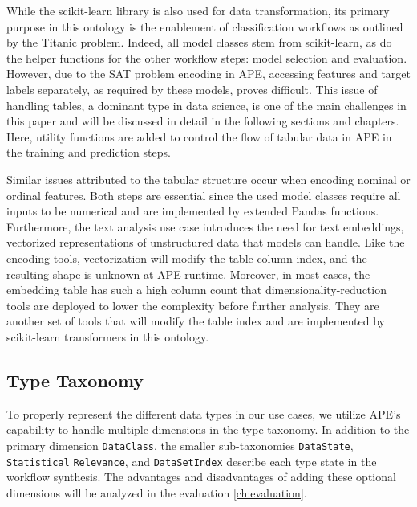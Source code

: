 While the scikit-learn library is also used for data transformation, its primary purpose in this ontology is the enablement of classification workflows as outlined by the Titanic problem. Indeed, all model classes stem from scikit-learn, as do the helper functions for the other workflow steps: model selection and evaluation. However, due to the SAT problem encoding in APE, accessing features and target labels separately, as required by these models, proves difficult. This issue of handling tables, a dominant type in data science, is one of the main challenges in this paper and will be discussed in detail in the following sections and chapters. Here, utility functions are added to control the flow of tabular data in APE in the training and prediction steps.

Similar issues attributed to the tabular structure occur when encoding nominal or ordinal features. Both steps are essential since the used model classes require all inputs to be numerical and are implemented by extended Pandas functions. Furthermore, the text analysis use case introduces the need for text embeddings, vectorized representations of unstructured data that models can handle. Like the encoding tools, vectorization will modify the table column index, and the resulting shape is unknown at APE runtime. Moreover, in most cases, the embedding table has such a high column count that dimensionality-reduction tools are deployed to lower the complexity before further analysis. They are another set of tools that will modify the table index and are implemented by scikit-learn transformers in this ontology.

\subsection{Type Taxonomy}
To properly represent the different data types in our use cases, we utilize APE’s capability to handle multiple dimensions in the type taxonomy. In addition to the primary dimension \verb|DataClass|, the smaller sub-taxonomies \verb|DataState|, \verb|Statistical| \verb|Relevance|, and \verb|DataSetIndex| describe each type state in the workflow synthesis. The advantages and disadvantages of adding these optional dimensions will be analyzed in the evaluation \autoref{ch:evaluation}.

